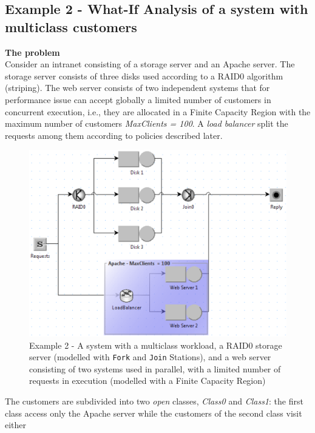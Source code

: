 \subsection{Example 2 - What-If Analysis of a system with multiclass
customers}
\noindent \textbf{The problem}\\
 Consider an intranet consisting of a storage server and an Apache server.
 The storage server consists of three disks used according to a RAID0 algorithm
 (striping). The web server consists of two independent systems that
 for performance
 issue can accept globally a limited number of customers in concurrent execution,
 i.e., they are allocated in
 a Finite Capacity Region with the maximum number of customers
 \emph{MaxClients = 100}.
 A \emph{load balancer} split the requests among them according to
 policies described later.\\
\begin{figure}[htb]
    \begin{center}
        \includegraphics[scale=.5]{img/jsimg/12.16.eps}
    \end{center}
    \caption{Example 2 - A system with a multiclass workload, a
    RAID0 storage server (modelled with \texttt{Fork} and
    \texttt{Join} Stations), and a web server consisting of two
    systems used in parallel, with a limited number of
    requests in execution (modelled with a Finite Capacity Region)}
    \label{fig:mulworkex2}
\end{figure}
The customers are subdivided into two \emph{open} classes,
\emph{Class0} and \emph{Class1}: the first class access only the
Apache server while the customers of the second class visit either
